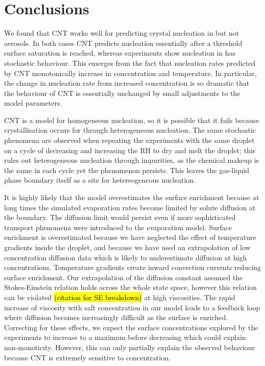 \documentclass[11pt,twoside]{report}
\begin{document}
\section{Conclusions}

We found that CNT works well for predicting crystal nucleation in  but not  aerosols.
In both cases CNT predicts nucleation essentially after a threshold surface saturation is reached, whereas experiments show nucleation in  has stochastic behaviour.
This emerges from the fact that nucleation rates predicted by CNT monotonically increase in concentration and temperature.
In particular, the change in nucleation rate from increased concentration is so dramatic that the behaviour of CNT is essentially unchanged by small adjustments to the model parameters.

CNT is a model for homogeneous nucleation, so it is possible that it fails because crystallisation occurs for  through heterogeneous nucleation.
The same stochastic phenomena are observed when repeating the experiments with the same droplet on a cycle of decreasing and increasing the RH to dry and melt the droplet; this rules out heterogeneous nucleation through impurities, as the chemical makeup is the same in each cycle yet the phenomenon persists.
This leaves the gas-liquid phase boundary itself as a site for hetereogeneous nucleation.

It is highly likely that the model overestimates the surface enrichment because at long times the simulated evaporation rates become limited by solute diffusion at the boundary.
The diffusion limit would persist even if more sophisticated transport phenomena were introduced to the evaporation model.
Surface enrichment is overestimated because we have neglected the effect of temperature gradients inside the droplet, and because we have used an extrapolation of low concentration diffusion data which is likely to underestimate diffusion at high concentrations.
Temperature gradients create inward convection currents reducing surface enrichment.
Our extrapolation of the diffusion constant assumed the Stokes-Einstein relation holds across the whole state space, however this relation can be violated \hl{(citation for SE breakdown)} at high viscosities.
The rapid increase of viscosity with salt concentration in our model leads to a feedback loop where diffusion becomes increasingly difficult as the surface is enriched.
Correcting for these effects, we expect the surface concentrations explored by the experiments to increase to a maximum before decreasing which could explain non-monoticity.
However, this can only partially explain the observed behaviour because CNT is extremely sensitive to concentration.
\end{document}
